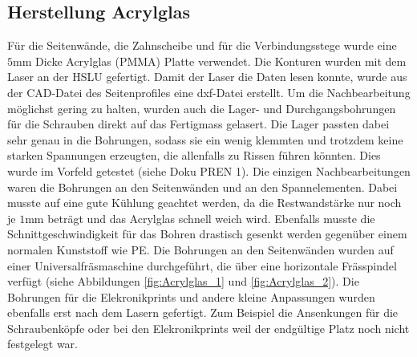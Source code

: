    \subsection{Herstellung Acrylglas}
		Für die Seitenwände, die Zahnscheibe und für die Verbindungsstege wurde eine 
		$5\si{\milli\meter}$ Dicke Acrylglas (PMMA) Platte verwendet. Die Konturen 
		wurden mit dem Laser an der HSLU gefertigt. Damit der Laser die Daten lesen 
		konnte, wurde aus der CAD-Datei des Seitenprofiles eine dxf-Datei erstellt. Um die Nachbearbeitung 
		möglichst gering zu halten, wurden auch die Lager- und Durchgangsbohrungen 
		für die Schrauben direkt auf das Fertigmass gelasert. Die Lager passten dabei 
		sehr genau in die Bohrungen, sodass sie ein wenig klemmten und trotzdem keine 
		starken Spannungen erzeugten, die allenfalls zu Rissen führen könnten. Dies 
		wurde im Vorfeld getestet (siehe Doku PREN 1). Die einzigen Nachbearbeitungen 
		waren die Bohrungen an den Seitenwänden und an den Spannelementen. 
		Dabei musste auf eine gute Kühlung geachtet werden, da die Restwandstärke nur 
		noch je $1\si{\milli\meter}$ beträgt und das Acrylglas schnell weich wird. 
		Ebenfalls musste die Schnittgeschwindigkeit für das Bohren drastisch gesenkt 
		werden gegenüber einem normalen Kunststoff wie PE. Die Bohrungen an 
		den Seitenwänden wurden auf einer Universalfräsmaschine durchgeführt, die über eine 
		horizontale Frässpindel verfügt (siehe Abbildungen \ref{fig:Acrylglas_1} und 
		\ref{fig:Acrylglas_2}). Die Bohrungen für die 
		Elekronikprints und andere kleine Anpassungen wurden ebenfalls erst nach dem 
		Lasern gefertigt. Zum Beispiel die Ansenkungen für die Schraubenköpfe oder bei 
		den Elekronikprints weil der endgültige Platz noch nicht festgelegt war.

